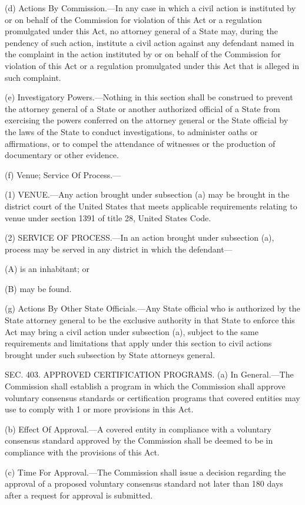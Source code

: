 (d) Actions By Commission.—In any case in which a civil action is instituted by or on behalf of the Commission for violation of this Act or a regulation promulgated under this Act, no attorney general of a State may, during the pendency of such action, institute a civil action against any defendant named in the complaint in the action instituted by or on behalf of the Commission for violation of this Act or a regulation promulgated under this Act that is alleged in such complaint.

(e) Investigatory Powers.—Nothing in this section shall be construed to prevent the attorney general of a State or another authorized official of a State from exercising the powers conferred on the attorney general or the State official by the laws of the State to conduct investigations, to administer oaths or affirmations, or to compel the attendance of witnesses or the production of documentary or other evidence.

(f) Venue; Service Of Process.—

(1) VENUE.—Any action brought under subsection (a) may be brought in the district court of the United States that meets applicable requirements relating to venue under section 1391 of title 28, United States Code.

(2) SERVICE OF PROCESS.—In an action brought under subsection (a), process may be served in any district in which the defendant—

(A) is an inhabitant; or

(B) may be found.

(g) Actions By Other State Officials.—Any State official who is authorized by the State attorney general to be the exclusive authority in that State to enforce this Act may bring a civil action under subsection (a), subject to the same requirements and limitations that apply under this section to civil actions brought under such subsection by State attorneys general.


SEC. 403. APPROVED CERTIFICATION PROGRAMS.
(a) In General.—The Commission shall establish a program in which the Commission shall approve voluntary consensus standards or certification programs that covered entities may use to comply with 1 or more provisions in this Act.

(b) Effect Of Approval.—A covered entity in compliance with a voluntary consensus standard approved by the Commission shall be deemed to be in compliance with the provisions of this Act.

(c) Time For Approval.—The Commission shall issue a decision regarding the approval of a proposed voluntary consensus standard not later than 180 days after a request for approval is submitted.

